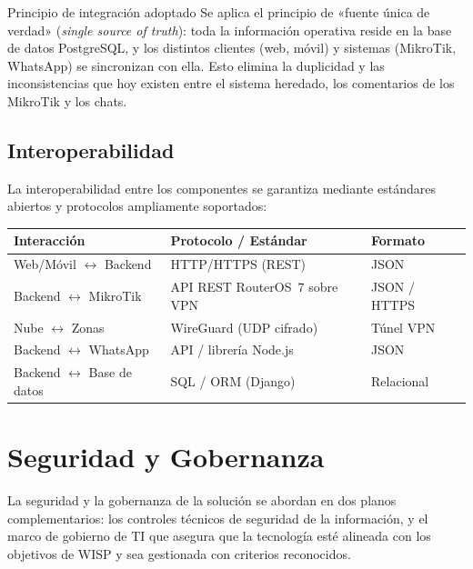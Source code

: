 \begin{upeubox}{Principio de integración adoptado}
Se aplica el principio de «fuente única de verdad» (\textit{single source of truth}):
toda la información operativa reside en la base de datos PostgreSQL, y los distintos
clientes (web, móvil) y sistemas (MikroTik, WhatsApp) se sincronizan con ella. Esto
elimina la duplicidad y las inconsistencias que hoy existen entre el sistema heredado,
los comentarios de los MikroTik y los chats.
\end{upeubox}

\subsection{Interoperabilidad}

La interoperabilidad entre los componentes se garantiza mediante estándares abiertos y
protocolos ampliamente soportados:

\begin{center}
\label{tab:interoperabilidad}
\begin{tabularx}{\textwidth}{L{3.8cm} X L{3cm}}
\toprule
\textbf{Interacción} & \textbf{Protocolo / Estándar} & \textbf{Formato} \\
\midrule
Web/Móvil $\leftrightarrow$ Backend & HTTP/HTTPS (REST) & JSON \\
Backend $\leftrightarrow$ MikroTik & API REST RouterOS~7 sobre VPN & JSON / HTTPS \\
Nube $\leftrightarrow$ Zonas & WireGuard (UDP cifrado) & Túnel VPN \\
Backend $\leftrightarrow$ WhatsApp & API / librería Node.js & JSON \\
Backend $\leftrightarrow$ Base de datos & SQL / ORM (Django) & Relacional \\
\bottomrule
\end{tabularx}
\end{center}

\section{Seguridad y Gobernanza}
\label{sec:seguridad}

La seguridad y la gobernanza de la solución se abordan en dos planos complementarios:
los controles técnicos de seguridad de la información, y el marco de gobierno de TI que
asegura que la tecnología esté alineada con los objetivos de WISP y sea gestionada con
criterios reconocidos.

